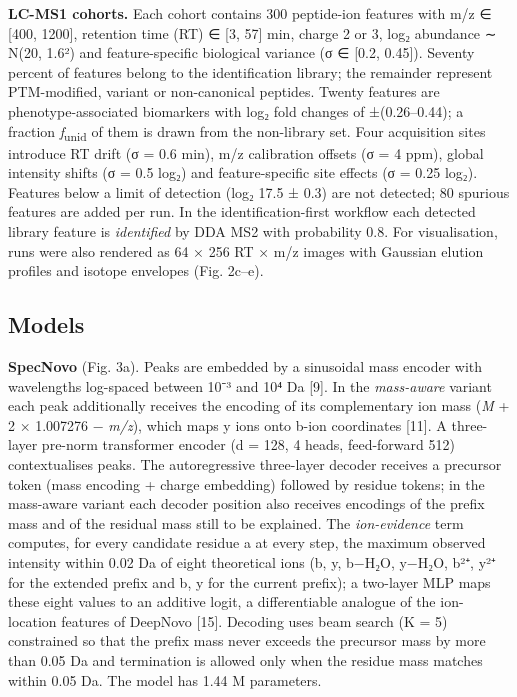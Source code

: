 \documentclass[
]{article}
\begin{document}
\textbf{LC-MS1 cohorts.} Each cohort contains 300 peptide-ion features
with m/z ∈ {[}400, 1200{]}, retention time (RT) ∈ {[}3, 57{]} min,
charge 2 or 3, log₂ abundance ∼ N(20, 1.6²) and feature-specific
biological variance (σ ∈ {[}0.2, 0.45{]}). Seventy percent of features
belong to the identification library; the remainder represent
PTM-modified, variant or non-canonical peptides. Twenty features are
phenotype-associated biomarkers with log₂ fold changes of ±(0.26--0.44);
a fraction \emph{f}\textsubscript{unid} of them is drawn from the
non-library set. Four acquisition sites introduce RT drift (σ = 0.6
min), m/z calibration offsets (σ = 4 ppm), global intensity shifts (σ =
0.5 log₂) and feature-specific site effects (σ = 0.25 log₂). Features
below a limit of detection (log₂ 17.5 ± 0.3) are not detected; 80
spurious features are added per run. In the identification-first
workflow each detected library feature is \emph{identified} by DDA MS2
with probability 0.8. For visualisation, runs were also rendered as 64 ×
256 RT × m/z images with Gaussian elution profiles and isotope envelopes
(Fig. 2c--e).

\hypertarget{models}{%
\subsection{Models}\label{models}}

\textbf{SpecNovo} (Fig. 3a). Peaks are embedded by a sinusoidal mass
encoder with wavelengths log-spaced between 10⁻³ and 10⁴ Da {[}9{]}. In
the \emph{mass-aware} variant each peak additionally receives the
encoding of its complementary ion mass (\emph{M} + 2 × 1.007276 −
\emph{m/z}), which maps y ions onto b-ion coordinates {[}11{]}. A
three-layer pre-norm transformer encoder (d = 128, 4 heads, feed-forward
512) contextualises peaks. The autoregressive three-layer decoder
receives a precursor token (mass encoding + charge embedding) followed
by residue tokens; in the mass-aware variant each decoder position also
receives encodings of the prefix mass and of the residual mass still to
be explained. The \emph{ion-evidence} term computes, for every candidate
residue a at every step, the maximum observed intensity within 0.02 Da
of eight theoretical ions (b, y, b−H₂O, y−H₂O, b²⁺, y²⁺ for the extended
prefix and b, y for the current prefix); a two-layer MLP maps these
eight values to an additive logit, a differentiable analogue of the
ion-location features of DeepNovo {[}15{]}. Decoding uses beam search (K
= 5) constrained so that the prefix mass never exceeds the precursor
mass by more than 0.05 Da and termination is allowed only when the
residue mass matches within 0.05 Da. The model has 1.44 M parameters.
\end{document}
